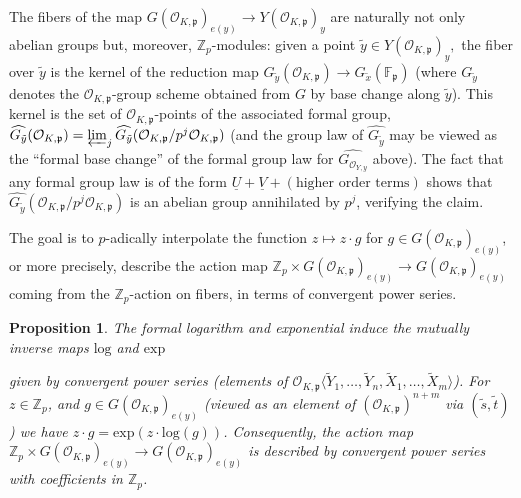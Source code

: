 \documentclass[11pt,oneside]{amsart}
\theoremstyle{plain}
\newtheorem{proposition}[theorem]{Proposition}
\theoremstyle{definition}
\def\Z{\mathbb{Z}}
\def\oh{\mathcal{O}}
\begin{document}
The fibers of the map $G(\oh_{K, \mathfrak{p}})_{e(y)}\rightarrow Y(\oh_{K, \mathfrak{p}})_{y}$ are naturally not only abelian groups but, moreover, $\mathbb{Z}_p$-modules: given a point $\tilde{y}\in Y(\oh_{K, \mathfrak{p}})_{y},$ the fiber over $\tilde{y}$ is the kernel of the reduction map $G_{\tilde{y}}(\oh_{K, \mathfrak{p}})\rightarrow G_{\tilde{x}}(\mathbb{F}_{\mathfrak{p}})$ (where $G_{\tilde{y}}$ denotes the $\oh_{K, \mathfrak{p}}$-group scheme obtained from $G$ by base change along $\tilde{y}$). This kernel is the set of $\oh_{K, \mathfrak{p}}$-points of the associated formal group, $\widehat{G_{\tilde{y}}}(\oh_{K, \mathfrak{p}})=\varprojlim_{j}\widehat{G_{\tilde{y}}}(\oh_{K, \mathfrak{p}}/p^j\oh_{K, \mathfrak{p}})$ (and the group law of $\widehat{G_{\tilde{y}}}$ may be viewed as the ``formal base change'' of the formal group law for $\widehat{G_{\oh_{Y, y}}}$ above). The fact that any formal group law is of the form $\underline{U}+\underline{V}+(\text{higher order terms})$ shows that $\widehat{G_{\tilde{y}}}(\oh_{K, \mathfrak{p}}/p^j\oh_{K, \mathfrak{p}})$ is an abelian group annihilated by $p^j$, verifying the claim.

The goal is to $p$-adically interpolate the function $z \mapsto z\cdot g$ for $g \in G(\oh_{K, \mathfrak{p}})_{e(y)}$, or more precisely, describe the action map $\Z_p\times G(\oh_{K, \mathfrak{p}})_{e(y)}\rightarrow G(\oh_{K, \mathfrak{p}})_{e(y)}$ coming from the $\Z_p$-action on fibers, in terms of convergent power series. %

\begin{proposition}\label{logexp}
The formal logarithm and exponential induce the mutually inverse maps $\mathrm{log}$ and $\mathrm{exp}$
\begin{center}
\end{center} 
given by convergent power series (elements of $\oh_{K, \mathfrak{p}}\langle \tilde{Y}_1, \dots, \tilde{Y}_n,\tilde{X}_1, \dots, \tilde{X}_m \rangle$).
For $z \in \Z_p$, and $g \in G(\oh_{K, \mathfrak{p}})_{e(y)}$ (viewed as an element of $(\oh_{K, \mathfrak{p}})^{n+m}$ via $(\tilde{s}, \tilde{t})$) we have $z \cdot g=\mathrm{exp}(z \cdot\mathrm{log}(g))$. Consequently, the action map $\mathbb{Z}_p \times G(\oh_{K, \mathfrak{p}})_{e(y)} \rightarrow G(\oh_{K, \mathfrak{p}})_{e(y)}$ is described by convergent power series with coefficients in $\Z_p$.
\end{proposition}
\end{document}
